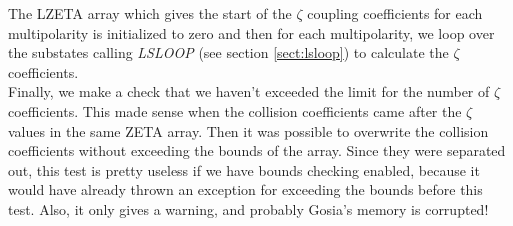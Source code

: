 \noindent The LZETA array which gives the start of the $\zeta$ coupling
coefficients for each multipolarity is initialized to zero and then for each
multipolarity, we loop over the substates calling {\em LSLOOP} (see section
\ref{sect:lsloop}) to calculate the $\zeta$ coefficients.\\

\noindent Finally, we make a check that we haven't exceeded the limit for
the number of $\zeta$ coefficients. This made sense when the collision
coefficients came after the $\zeta$ values in the same ZETA array. Then it
was possible to overwrite the collision coefficients without exceeding the
bounds of the array. Since they were separated out, this test is pretty
useless if we have bounds checking enabled, because it would have already
thrown an exception for exceeding the bounds before this test. Also, it only
gives a warning, and probably Gosia's memory is corrupted!\\
